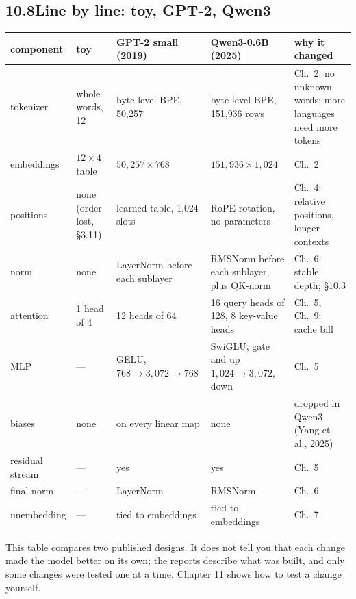 
\subsection*{10.8\quad Line by line: toy, GPT-2, Qwen3}

\begin{center}
\footnotesize
\begin{longtable}{@{}P{2.3cm} P{2.7cm} P{3.3cm} P{3.4cm} P{2.4cm}@{}}
\toprule
component & toy & GPT-2 small (2019) & Qwen3-0.6B (2025) & why it changed\\
\midrule
\endhead
tokenizer & whole words, 12 & byte-level BPE, 50{,}257 & byte-level BPE, 151{,}936 rows & Ch.\ 2: no unknown words; more languages need more tokens\\
embeddings & $12\times4$ table & $50{,}257\times768$ & $151{,}936\times1{,}024$ & Ch.\ 2\\
positions & none (order lost, \S3.11) & learned table, 1{,}024 slots & RoPE rotation, no parameters & Ch.\ 4: relative positions, longer contexts\\
norm & none & LayerNorm before each sublayer & RMSNorm before each sublayer, plus QK-norm & Ch.\ 6: stable depth; \S10.3\\
attention & 1 head of 4 & 12 heads of 64 & 16 query heads of 128, 8 key-value heads & Ch.\ 5, Ch.\ 9: cache bill\\
MLP & --- & GELU, $768\to3{,}072\to768$ & SwiGLU, gate and up $1{,}024\to3{,}072$, down & Ch.\ 5\\
biases & none & on every linear map & none & dropped in Qwen3 (Yang et al., 2025)\\
residual stream & --- & yes & yes & Ch.\ 5\\
final norm & --- & LayerNorm & RMSNorm & Ch.\ 6\\
unembedding & --- & tied to embeddings & tied to embeddings & Ch.\ 7\\
\bottomrule
\end{longtable}
\end{center}

\begin{breaks}
This table compares two published designs. It does not tell you that each change made the model better on its
own; the reports describe what was built, and only some changes were tested one at a time. Chapter 11 shows how to
test a change yourself.
\end{breaks}

